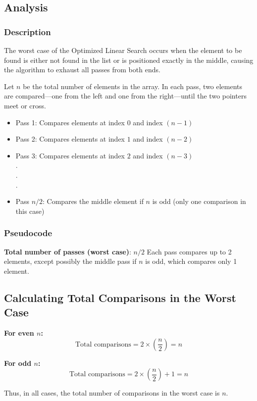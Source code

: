 \subsection{Analysis}

\subsubsection{Description}
The worst case of the Optimized Linear Search occurs when the element to be found is either not found in the list or is positioned exactly in the middle, causing the algorithm to exhaust all passes from both ends.

Let $n$ be the total number of elements in the array.  
In each pass, two elements are compared—one from the left and one from the right—until the two pointers meet or cross.

\begin{itemize}
	\item Pass 1: Compares elements at index $0$ and index $(n - 1)$
	\item Pass 2: Compares elements at index $1$ and index $(n - 2)$
	\item Pass 3: Compares elements at index $2$ and index $(n - 3)$ \\
.\\
.\\
.
	\item Pass $n/2$: Compares the middle element if $n$ is odd (only one comparison in this case)
\end{itemize}

\subsubsection{Pseudocode}
\textbf{Total number of passes (worst case)}: $n/2$  
Each pass compares up to 2 elements, except possibly the middle pass if $n$ is odd, which compares only 1 element.

\subsection*{Calculating Total Comparisons in the Worst Case}

\textbf{For even $n$:}
\[
\text{Total comparisons} = 2 \times \left(\frac{n}{2}\right) = n
\]

\textbf{For odd $n$:}
\[
\text{Total comparisons} = 2 \times \left(\frac{n}{2}\right) + 1 = n
\]

Thus, in all cases, the total number of comparisons in the worst case is $n$.

